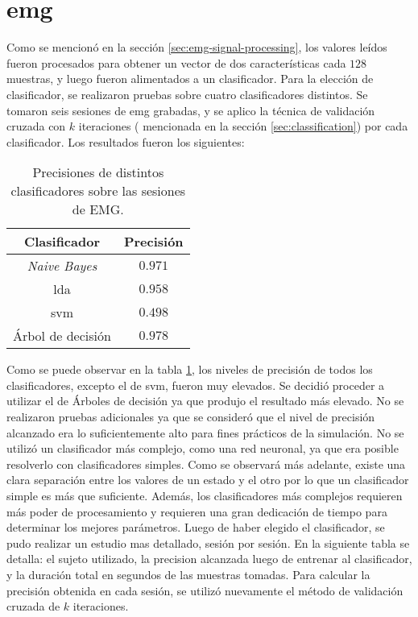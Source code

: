 \section{\acrshort{emg}}

Como se mencionó en la sección \ref{sec:emg-signal-processing}, los valores leídos fueron procesados para obtener un vector de dos características cada $128$ muestras, y luego fueron alimentados a un clasificador. Para la elección de clasificador, se realizaron pruebas sobre cuatro clasificadores distintos. Se tomaron seis sesiones de \acrshort{emg} grabadas, y se aplico la técnica de validación cruzada con $k$ iteraciones ( mencionada en la sección \ref{sec:classification}) por cada clasificador. Los resultados fueron los siguientes:

\begin{table}[H]
\centering
\begin{tabular}{ |c|c| }
 \hline
 Clasificador & Precisión \\ 
 \hline
 \emph{Naive Bayes} & $0.971$ \\
 \hline
 \gls{lda} & $0.958$ \\
 \hline
  \gls{svm} & $0.498$ \\
 \hline
 Árbol de decisión & $0.978$ \\
 
 \hline
\end{tabular}
\caption{Precisiones de distintos clasificadores sobre las sesiones de EMG.}
\label{tab:emg-classifiers}
\end{table}

Como se puede observar en la tabla \ref{tab:emg-classifiers}, los niveles de precisión de todos los clasificadores, excepto el de \acrshort{svm}, fueron muy elevados. Se decidió proceder a utilizar el de Árboles de decisión ya que produjo el resultado más elevado. No se realizaron pruebas adicionales ya que se consideró que el nivel de precisión alcanzado era lo suficientemente alto para fines prácticos de la simulación. No se utilizó un clasificador más complejo, como una red neuronal, ya que era posible resolverlo con clasificadores simples. Como se observará más adelante, existe una clara separación entre los valores de un estado y el otro por lo que un clasificador simple es más que suficiente. Además, los clasificadores más complejos requieren más poder de procesamiento y requieren una gran dedicación de tiempo para determinar los mejores parámetros. Luego de haber elegido el clasificador, se pudo realizar un estudio mas detallado, sesión por sesión. En la siguiente tabla se detalla: el sujeto utilizado, la precision alcanzada luego de entrenar al clasificador, y la duración total en segundos de las muestras tomadas. Para calcular la precisión obtenida en cada sesión, se utilizó nuevamente el método de validación cruzada de $k$ iteraciones.

